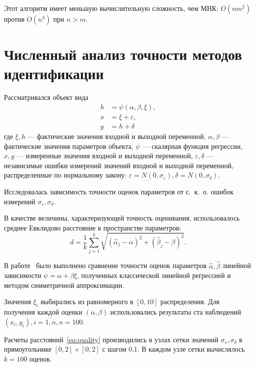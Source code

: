Этот алгоритм имеет меньшую вычислительную сложность,
чем МНК: \( O(nm^2) \) против \( O(n^3) \) при \( n > m \).

\section{Численный анализ точности методов идентификации}

Рассматривался объект вида
\begin{equation}
  \label{eq:model}
  \begin{aligned}
  h &= \psi (\alpha, \beta, \xi), \\
  x &= \xi + \varepsilon, \\
  y &= h + \delta
  \end{aligned}
\end{equation}
где
\( \xi, h \) --- фактические значения входной и выходной переменной,
\( \alpha, \beta \) --- фактические значения параметров объекта,
\( \psi \) --- скалярная функция регрессии,
\( x, y \) --- измеренные значения входной и выходной переменной,
\( \varepsilon, \delta \) --- независимые ошибки измерений значений входной и выходной переменной,
распределенные по нормальному закону:
\( \varepsilon = N(0, \sigma_{\varepsilon}), \delta = N(0, \sigma_{\delta}) \).

Исследовалась зависимость точности оценок параметров от с.~к.~о.
ошибок измерений \( \sigma_{\varepsilon}, \sigma_{\delta} \).

В качестве величины, характеризующей точность оценивания,
использовалось среднее Евклидово расстояние в пространстве параметров:
\begin{equation}
  \label{eq:quality}
  d = \frac{1}{k} \sum_{j=1}^k \sqrt{(\hat{\alpha}_j - \alpha)^2 + (\hat{\beta}_j - \beta)^2}.
\end{equation}

В работе~\cite{budny17} было выполнено сравнение точности оценок параметров
\( \hat{\alpha}, \hat{\beta} \) линейной зависимости \( \psi = \alpha + \beta \xi \),
полученных классической линейной регрессией и методом симметричной аппроксимации.

Значения \( \xi_i \) выбирались из равномерного в \( [0, 10] \) распределения.
Для получения каждой оценки \( ( \alpha, \beta ) \) использовались результаты
ста наблюдений \( ( x_i, y_i ), i = \overline{1, n}, n = 100 \).

Расчеты расстояний~\eqref{eq:quality} производились в узлах сетки значений
\( \sigma_{\varepsilon}, \sigma_{\delta} \) в прямоугольнике
\( [0, 2] \times [0, 2] \) с шагом 0{,}1.
В каждом узле сетки вычислялось \( k = 100 \) оценок.


